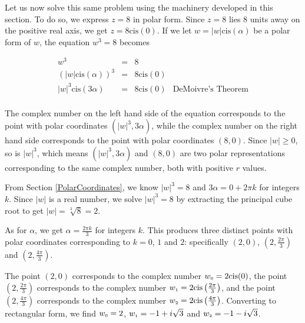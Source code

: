 \documentclass{ximera}
\begin{document}
\smallskip

Let us now solve this same problem using the machinery developed in this section.  To do so, we express $z = 8$ in polar form. Since $z=8$ lies $8$ units away on the positive real axis, we get $z = 8 \text{cis}(0)$.  If we let $w = |w| \text{cis}(\alpha)$ be a polar form of $w$, the equation $w^3 = 8$ becomes

\[ \begin{array}{rcll}

w^3 & = & 8 & \\[3pt]
\left(|w| \text{cis}(\alpha)\right)^3 & = & 8 \text{cis}(0) & \\[3pt]
|w|^3 \text{cis}(3\alpha) & = & 8 \text{cis}(0) & \text{DeMoivre's Theorem} \\[3pt]

\end{array}\]

The complex number on the left hand side of the equation corresponds to the point with polar coordinates $\left(|w|^3, 3\alpha\right)$,   while the complex number on the right hand side corresponds to the point with polar coordinates $(8,0)$.  Since $|w| \geq 0$, so is $|w|^3$, which means  $\left(|w|^3, 3\alpha\right)$ and $(8,0)$ are two polar representations corresponding to the same complex number, both with positive $r$ values.  

\smallskip

From Section \ref{PolarCoordinates}, we know $|w|^3 = 8$ and $3\alpha = 0 + 2\pi k$ for integers $k$.  Since $|w|$ is a real number, we solve $|w|^3 = 8$ by extracting the principal cube root to get  $|w| = \sqrt[3]{8} = 2$.  

\smallskip

As for $\alpha$, we get  $\alpha = \frac{2\pi k}{3}$ for integers $k$.  This produces three distinct points with polar coordinates corresponding to $k = 0$, $1$ and $2$: specifically $(2,0)$, $\left(2, \frac{2\pi}{3}\right)$ and $\left(2, \frac{4\pi}{3}\right)$.  

\smallskip

The point $(2,0)$ corresponds to the complex number  $w_{\text{\tiny $0$}} = 2 \text{cis}(0)$,  the point $\left(2, \frac{2\pi}{3}\right)$  corresponds to the complex number $w_{\text{\tiny $1$}} = 2 \text{cis}\left(\frac{2\pi}{3}\right)$,  and the point $\left(2, \frac{4\pi}{3}\right)$ corresponds to the complex number $w_{\text{\tiny $2$}} = 2 \text{cis}\left(\frac{4\pi}{3}\right)$.  Converting to rectangular form, we find $w_{\text{\tiny $0$}} = 2$, $w_{\text{\tiny $1$}} = -1 + i\sqrt{3}$ and $w_{\text{\tiny $2$}} = -1-i\sqrt{3}$. 
\end{document}
